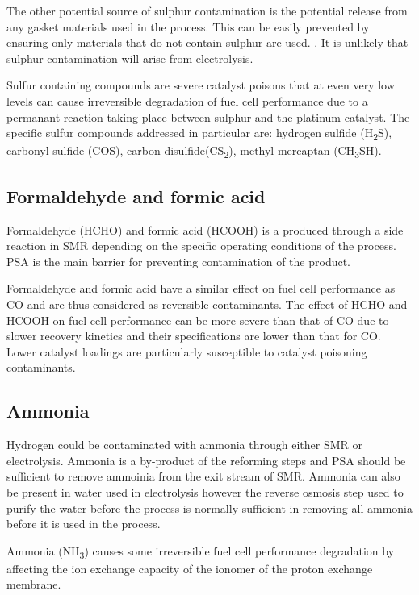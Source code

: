 The other potential source of sulphur contamination is the potential release from any gasket materials used in the process. This can be easily prevented by ensuring only materials that do not contain sulphur are used. \cite{InternationalStandardISO14687-2:20122012}. It is unlikely that sulphur contamination will arise from electrolysis. 

Sulfur containing compounds are severe catalyst poisons that at even very low levels can cause irreversible degradation of fuel cell performance due to a permanant reaction taking place between sulphur and the platinum catalyst. The specific sulfur compounds addressed in particular are: hydrogen sulfide (H\textsubscript{2}S), carbonyl sulfide (COS), carbon disulfide(CS\textsubscript{2}), methyl mercaptan (CH\textsubscript{3}SH). \cite{InternationalStandardISO14687-2:20122012} 

\subsection*{Formaldehyde and formic acid}
Formaldehyde (HCHO) and formic acid (HCOOH) is a produced through a side reaction in SMR depending on the specific operating conditions of the process.\cite{Muradov2015} PSA is the main barrier for preventing contamination of the product. \cite{Bacquart2018}

Formaldehyde and formic acid have a similar effect on fuel cell performance as CO and are thus considered as reversible contaminants. The effect of HCHO and HCOOH on fuel cell performance can be more severe than that of CO due to slower recovery kinetics and their specifications are lower than that for CO. \cite{InternationalStandardISO14687-2:20122012} Lower catalyst loadings are particularly susceptible to catalyst poisoning contaminants.

\subsection*{Ammonia}
Hydrogen could be contaminated with ammonia through either SMR or electrolysis. Ammonia is a by-product of the reforming steps and PSA should be sufficient to remove ammoinia from the exit stream of SMR. Ammonia can also be present in water used in electrolysis however the reverse osmosis step used to purify the water before the process is normally sufficient in removing all ammonia before it is used in the process. \cite{Bacquart2018}

Ammonia (NH\textsubscript{3}) causes some irreversible fuel cell performance degradation by affecting the ion exchange capacity of the ionomer of the proton exchange membrane. \cite{InternationalStandardISO14687-2:20122012}

